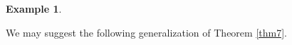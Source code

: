 \documentclass[pdflatex,sn-apa,11pt]{sn-jnl}%
\newtheorem{example}{Example}%
\begin{document}
\begin{example}




\end{example}

We may suggest the following generalization of Theorem \ref{thm7}. 
\end{document}
